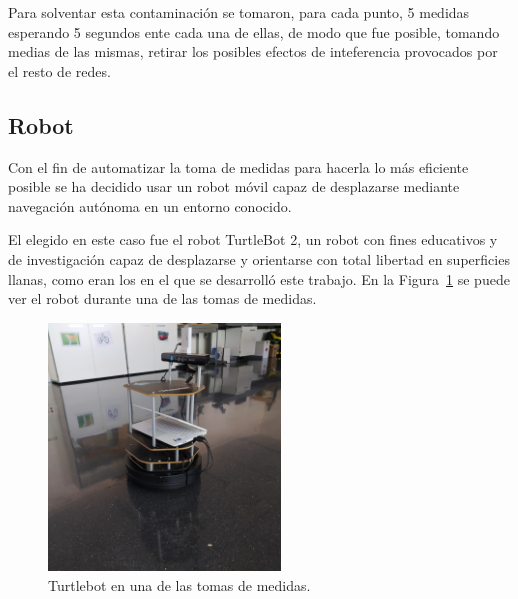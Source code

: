 Para solventar esta contaminación se tomaron, para cada punto, 5 medidas esperando 5 segundos ente cada una de ellas, de modo que fue posible, tomando medias de las mismas, retirar los posibles efectos de inteferencia provocados por el resto de redes.



\subsection{Robot}

Con el fin de automatizar la toma de medidas para hacerla lo más eficiente posible se ha decidido usar un robot móvil capaz de desplazarse mediante navegación autónoma en un entorno conocido.

El elegido en este caso fue el robot TurtleBot 2, un robot con fines educativos y de investigación capaz de desplazarse y orientarse con total libertad en superficies llanas, como eran los en el que se desarrolló este trabajo.
En la Figura~\ref{fig:robot} se puede ver el robot durante una de las tomas de medidas.

\begin{figure}[H]
    \centering
    \includegraphics[width=0.55\textwidth]{pic/robot_lab.jpg}
    \caption{Turtlebot en una de las tomas de medidas.}
    \label{fig:robot}
\end{figure}

